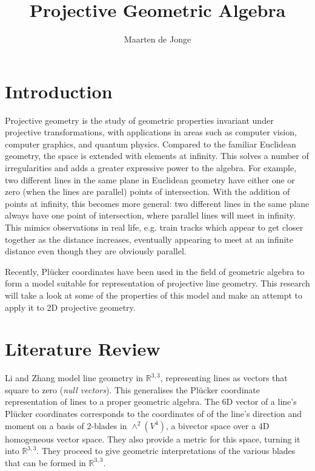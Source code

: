 \documentclass[a4paper, 10pt]{article}
\author{Maarten de Jonge}
\title{Projective Geometric Algebra}
\begin{document}
\newcommand{\rp}{$\mathbb{R}^{3,3}$ }

\maketitle

\section{Introduction}
Projective geometry is the study of geometric properties invariant under
projective transformations, with applications in areas such as computer vision,
computer graphics, and quantum physics. Compared to the familiar Euclidean
geometry, the space is extended with elements at infinity. This solves a number
of irregularities and adds a greater expressive power to the algebra. For
example, two different lines in the same plane in Euclidean geometry have either
one or zero (when the lines are parallel) points of intersection. With the
addition of points at infinity, this becomes more general: two different lines
in the same plane always have one point of intersection, where parallel lines
will meet in infinity. This mimics observations in real life, e.g. train tracks
which appear to get closer together as the distance increases, eventually
appearing to meet at an infinite distance even though they are obviously parallel.

Recently, Pl\"{u}cker coordinates have been used in the field of geometric
algebra to form a model suitable for representation of projective line
geometry. This research will take a look at some of the properties of this
model and make an attempt to apply it to 2D projective geometry.

\section{Literature Review}
Li and Zhang\cite{hangbo2011} model line geometry in $\mathbb{R}^{3,3}$,
representing lines as vectors that square to zero (\emph{null vectors}). This
generalises the Pl\"{u}cker coordinate representation of lines to a proper
geometric algebra. The 6D vector of a line's Pl\"{u}cker coordinates corresponds
to the coordinates of of the line's direction and moment on a basis of 2-blades
in $\wedge^2(V^4)$, a bivector space over a 4D homogeneous vector space. They
also provide a metric for this space, turning it into $\mathbb{R}^{3, 3}$.
They proceed to give geometric interpretations of the various blades that can
be formed in $\mathbb{R}^{3, 3}$.
\end{document}
